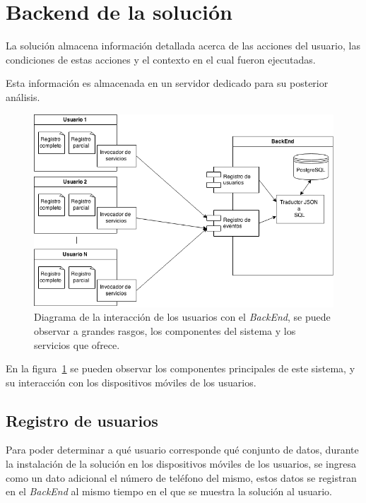 \section{Backend de la solución}

La solución almacena información detallada acerca de las acciones del usuario,
las condiciones de estas acciones y el contexto en el cual fueron ejecutadas.

Esta información es almacenada en un servidor dedicado para su posterior
análisis.

\begin{figure}[ht]
\centering
\includegraphics[scale=0.5]{propuesta/backend_diagrama.png}
\caption{Diagrama de la interacción de los usuarios con el \textit{BackEnd}, se
    puede observar a grandes rasgos, los componentes del sistema y los servicios
    que ofrece.}
\label{fig:backend_diagrama}
\end{figure}

En la figura~\ref{fig:backend_diagrama} se pueden observar los componentes
principales de este sistema, y su interacción con los dispositivos móviles de
los usuarios. 

\subsection{Registro de usuarios}

Para poder determinar a qué usuario corresponde qué conjunto de datos, durante la
instalación de la solución en los dispositivos móviles de los usuarios, se ingresa como
un dato adicional el número de teléfono del mismo, estos datos se registran
en el \textit{BackEnd} al mismo tiempo en el que se muestra la solución al usuario.

